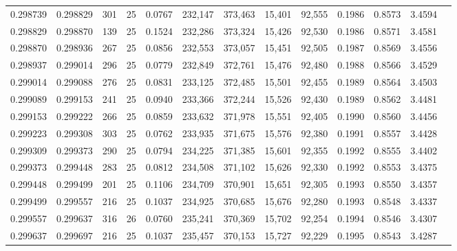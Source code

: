 \begin{tabular}{rrrrrrrrrrrrr}
0.298739 & 0.298829 &   301 &  25 &                                     0.0767 & 232,147 & 373,463 &  15,401 &  92,555 & 0.1986 & 0.8573 & 3.4594 \\
0.298829 & 0.298870 &   139 &  25 &                                     0.1524 & 232,286 & 373,324 &  15,426 &  92,530 & 0.1986 & 0.8571 & 3.4581 \\
0.298870 & 0.298936 &   267 &  25 &                                     0.0856 & 232,553 & 373,057 &  15,451 &  92,505 & 0.1987 & 0.8569 & 3.4556 \\
0.298937 & 0.299014 &   296 &  25 &                                     0.0779 & 232,849 & 372,761 &  15,476 &  92,480 & 0.1988 & 0.8566 & 3.4529 \\
0.299014 & 0.299088 &   276 &  25 &                                     0.0831 & 233,125 & 372,485 &  15,501 &  92,455 & 0.1989 & 0.8564 & 3.4503 \\
0.299089 & 0.299153 &   241 &  25 &                                     0.0940 & 233,366 & 372,244 &  15,526 &  92,430 & 0.1989 & 0.8562 & 3.4481 \\
0.299153 & 0.299222 &   266 &  25 &                                     0.0859 & 233,632 & 371,978 &  15,551 &  92,405 & 0.1990 & 0.8560 & 3.4456 \\
0.299223 & 0.299308 &   303 &  25 &                                     0.0762 & 233,935 & 371,675 &  15,576 &  92,380 & 0.1991 & 0.8557 & 3.4428 \\
0.299309 & 0.299373 &   290 &  25 &                                     0.0794 & 234,225 & 371,385 &  15,601 &  92,355 & 0.1992 & 0.8555 & 3.4402 \\
0.299373 & 0.299448 &   283 &  25 &                                     0.0812 & 234,508 & 371,102 &  15,626 &  92,330 & 0.1992 & 0.8553 & 3.4375 \\
0.299448 & 0.299499 &   201 &  25 &                                     0.1106 & 234,709 & 370,901 &  15,651 &  92,305 & 0.1993 & 0.8550 & 3.4357 \\
0.299499 & 0.299557 &   216 &  25 &                                     0.1037 & 234,925 & 370,685 &  15,676 &  92,280 & 0.1993 & 0.8548 & 3.4337 \\
0.299557 & 0.299637 &   316 &  26 &                                     0.0760 & 235,241 & 370,369 &  15,702 &  92,254 & 0.1994 & 0.8546 & 3.4307 \\
0.299637 & 0.299697 &   216 &  25 &                                     0.1037 & 235,457 & 370,153 &  15,727 &  92,229 & 0.1995 & 0.8543 & 3.4287 \\

\end{tabular}
